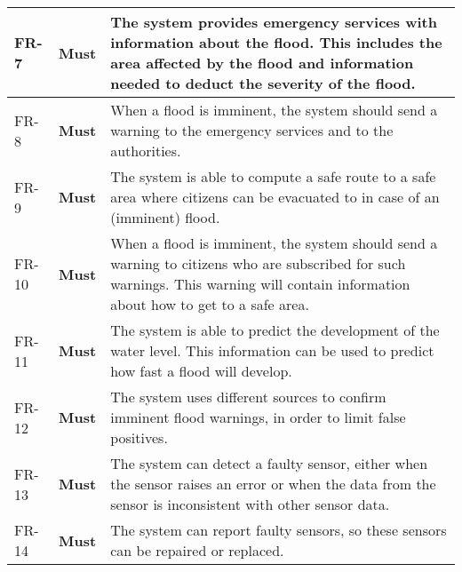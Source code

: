 \begin{longtable}{p{} p{} p{}}
    \hline {} \label{fr:7} FR-7 & 
      \textbf{Must} &
     The system provides emergency services with information about the flood. This includes the area affected by the flood and information needed to deduct the severity of the flood. \\
    
	\hline {} \label{fr:8} FR-8 & 
      \textbf{Must} &
      When a flood is imminent, the system should send a warning to the emergency services and to the authorities.\\
    
    \hline {} \label{fr:9} FR-9 & 
      \textbf{Must} &
      The system is able to compute a safe route to a safe area where citizens can be evacuated to in case of an (imminent) flood. \\    

    \hline {} \label{fr:10} FR-10 & 
      \textbf{Must} &
      When a flood is imminent, the system should send a warning to citizens who are subscribed for such warnings. This warning will contain information about how to get to a safe area. \\
	
    \hline {} \label{fr:11} FR-11 & 
      \textbf{Must} &
      The system is able to predict the development of the water level. This information can be used to predict how fast a flood will develop. \\
	
    \hline {} \label{fr:12} FR-12 & 
      \textbf{Must} &
     The system uses different sources to confirm imminent flood warnings, in order to limit false positives. \\%
	
    \hline {} \label{fr:13} FR-13 & 
      \textbf{Must} &
     The system can detect a faulty sensor, either when the sensor raises an error or when the data from the sensor is inconsistent with other sensor data. \\
	
    \hline {} \label{fr:14} FR-14 & 
      \textbf{Must} &
     The system can report faulty sensors, so these sensors can be repaired or replaced. \\ %
    

\end{longtable}
